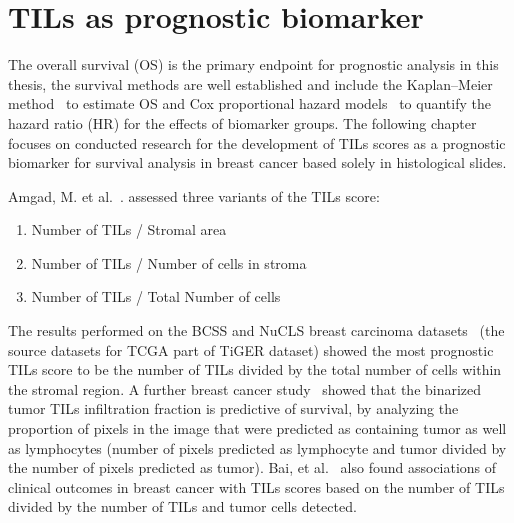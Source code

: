 \section{TILs as prognostic biomarker}
The overall survival (OS) is the primary endpoint for prognostic analysis in this thesis,
the survival methods are well established and include the Kaplan–Meier method~\cite{kaplan1958nonparametric} to estimate OS
and Cox proportional hazard models~\cite{https://doi.org/10.1111/j.2517-6161.1972.tb00899.x} to quantify the hazard ratio (HR) for the effects of biomarker
groups. The following chapter focuses on conducted research for the development of TILs scores as a
prognostic biomarker for survival analysis in breast cancer based solely in histological slides.

Amgad, M. et al.~\cite{kos2020pitfalls, amgad2022mutils}. assessed three variants of the TILs score:
\begin{enumerate}
    \itemsep0em 
    \item Number of TILs / Stromal area 
    \item Number of TILs / Number of cells in stroma
    \item Number of TILs / Total Number of cells 
\end{enumerate}
The results performed on the BCSS and NuCLS breast carcinoma datasets~\cite{amgad2019structured, amgad2021nucls}
(the source datasets for TCGA part of TiGER dataset) showed the most prognostic TILs score to be the number of TILs
divided by the total number of cells within the stromal region.
A further breast cancer study~\cite{le2020utilizing} showed that the binarized tumor TILs infiltration fraction is
predictive of survival, by analyzing the proportion of pixels in the image that were predicted as containing
tumor as well as lymphocytes (number of pixels predicted as lymphocyte and tumor divided by the number of pixels
predicted as tumor).
Bai, et al.~\cite{bai2021open} also found associations of clinical outcomes in breast cancer with TILs scores based on
the number of TILs divided by the number of TILs and tumor cells detected.


